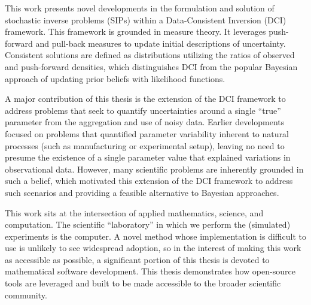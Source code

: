 This work presents novel developments in the formulation and solution of stochastic inverse problems (SIPs) within a Data-Consistent Inversion (DCI) framework.
This framework is grounded in measure theory.
It leverages push-forward and pull-back measures to update initial descriptions of uncertainty.
Consistent solutions are defined as distributions utilizing the ratios of observed and push-forward densities, which distinguishes DCI from the popular Bayesian approach of updating prior beliefs with likelihood functions.

A major contribution of this thesis is the extension of the DCI framework to address problems that seek to quantify uncertainties around a single ``true'' parameter from the aggregation and use of noisy data.
Earlier developments focused on problems that quantified parameter variability inherent to natural processes (such as manufacturing or experimental setup), leaving no need to presume the existence of a single parameter value that explained variations in observational data.
However, many scientific problems are inherently grounded in such a belief, which motivated this extension of the DCI framework to address such scenarios and providing a feasible alternative to Bayesian approaches.

This work sits at the intersection of applied mathematics, science, and computation.
The scientific ``laboratory'' in which we perform the (simulated) experiments is the computer.
A novel method whose implementation is difficult to use is unlikely to see widespread adoption, so in the interest of making this work as accessible as possible, a significant portion of this thesis is devoted to mathematical software development.
This thesis demonstrates how open-source tools are leveraged and built to be made accessible to the broader scientific community.
